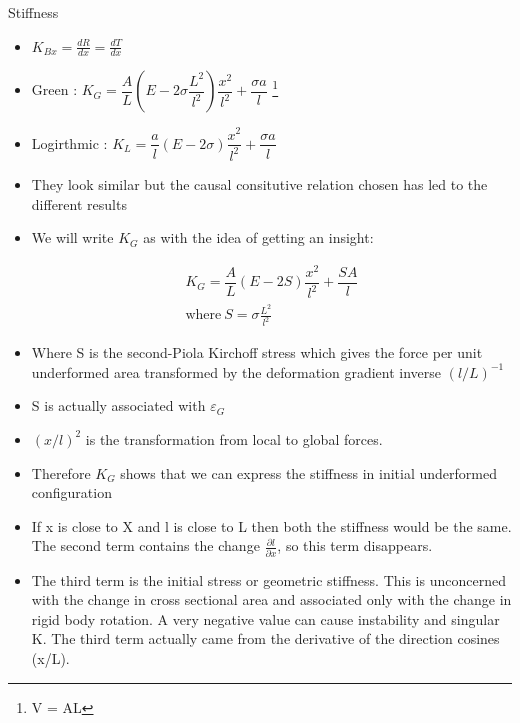 	\begin{frame}{Stiffness}
		\begin{block}{}
			\begin{itemize}
				\item $K_{Bx} =  \frac{dR}{dx} = \frac{dT}{dx}$
				
				\item Green : $K_{G} =  \dfrac{A}{L}\left(E - 2\sigma \dfrac{L^2}{l^2} \right)\dfrac{x^2}{l^2} + \dfrac{\sigma a}{l}$ \footnote{V = AL}
				
				\item  Logirthmic : $K_{L} =  \dfrac{a}{l}\left(E - 2\sigma \right)\dfrac{x^2}{l^2} + \dfrac{\sigma a}{l}$		
			\end{itemize}
		\end{block}
	
		\begin{itemize}
			\item  They look similar but the causal consitutive relation chosen has led to the different results
			
			\item We will write $K_G$ as with the idea of getting an insight:
			
			\begin{align*}
				K_{G} =  \dfrac{A}{L}\left(E - 2S \right)\dfrac{x^2}{l^2} + \dfrac{S A}{l}\\
				\text{where}~S = \sigma \frac{L^2}{l^2}
			\end{align*}
			\item  Where S is the second-Piola Kirchoff stress which gives the force per unit underformed area transformed by the deformation gradient inverse $(l/L)^{-1}$
		\end{itemize}
		 
	\end{frame}

	\begin{frame}
		\begin{itemize}
			\item S is actually associated with $\varepsilon_G$
			\item $(x/l)^2$ is the transformation from local to global forces. 
			\item Therefore $K_G$ shows that we can express the stiffness in initial underformed configuration
			\item If x is close to X and l is close to L then both the stiffness would be the same. The second term contains the change $\frac{\partial l}{\partial x}$, so this term disappears. 
			\item The third term is the initial stress or geometric stiffness. This is unconcerned with the change in cross sectional area and associated only with the change in rigid body rotation. A very negative value can cause instability and singular K. The third term actually came from the derivative of the direction cosines (x/L). 
			
		\end{itemize}
	\end{frame}


